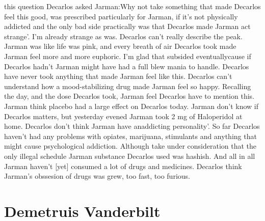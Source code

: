 \documentclass[12pt]{book}
\begin{document}
this question Decarlos asked Jarman:Why not take something that made Decarlos feel this good, was prescribed particularly for Jarman, if it's not physically addicted and the only bad side practically was that Decarlos made Jarman act strange'. I'm already strange as was. Decarlos can't really describe the peak. Jarman was like life was pink, and every breath of air Decarlos took made Jarman feel more and more euphoric. I'm glad that subsided eventuallycause if Decarlos hadn't Jarman might have had a full blew mania to handle. Decarlos have never took anything that made Jarman feel like this. Decarlos can't understand how a mood-stabilizing drug made Jarman feel so happy. Recalling the day, and the dose Decarlos took, Jarman feel Decarlos have to mention this. Jarman think placebo had a large effect on Decarlos today. Jarman don't know if Decarlos matters, but yesterday evened Jarman took 2 mg of Haloperidol at home. Decarlos don't think Jarman have anaddicting personality'. So far Decarlos haven't had any problems with opiates, marijuana, stimulants and anything that might cause psychological addiction. Although take under consideration that the only illegal schedule Jarman substance Decarlos used was hashish. And all in all Jarman haven't [yet] consumed a lot of drugs and medicines. Decarlos think Jarman's obssesion of drugs was grew, too fast, too furious.



\chapter{Demetruis Vanderbilt}
\end{document}
